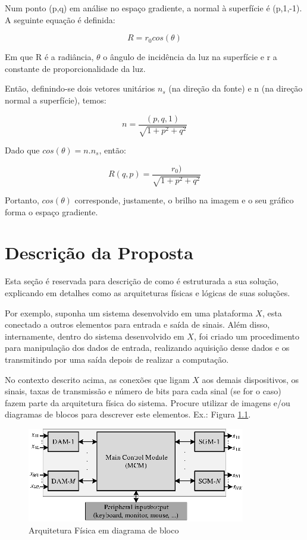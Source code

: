 \documentclass[
	12pt,				%
	openright,			%
	oneside,			%
	a4paper,			%
	brazil,				%
	]{abntex2}
\begin{document}
Num ponto (p,q) em análise no espaço gradiente, a normal à superfície é (p,1,-1). A seguinte equação é definida:

\begin{equation} 
R = r_{0}cos(\theta)
\label{eq:reflectancia}
\end{equation}

Em que R é a radiância, $\theta$ o ângulo de incidência da luz na superfície e r a constante de proporcionalidade da luz.

Então, definindo-se dois vetores unitários $n_{s}$ (na direção da fonte) e n (na direção normal a superfície), temos:

\begin{equation} 
n = \frac{(p,q,1)}{\sqrt{1+p^2+q^2}}
\end{equation}

Dado que $cos(\theta)=n.n_{s}$, então:

\begin{equation} 
R(q,p) = \frac{r_{0})}{\sqrt{1+p^2+q^2}}
\end{equation}

Portanto, $cos(\theta)$ corresponde, justamente, o brilho na imagem e o seu gráfico forma o espaço gradiente.

\chapter{Descrição da Proposta}\label{Descricao}

Esta seção é reservada para descrição de como é estruturada a sua solução, explicando em detalhes como as arquiteturas físicas e lógicas de suas soluções. 

Por exemplo, suponha um sistema desenvolvido em uma plataforma $X$, esta conectado a outros elementos para entrada e saída de sinais. Além disso, internamente, dentro do sistema desenvolvido em $X$, foi criado um procedimento para manipulação dos dados de entrada, realizando aquisição desse dados e os transmitindo por uma saída depois de realizar a computação.

No contexto descrito acima, as conexões que ligam $X$ aos demais dispositivos, os sinais, taxas de transmissão e número de bits para cada sinal (se for o caso) fazem parte da arquitetura física do sistema. Procure utilizar de imagens e/ou diagramas de blocos para descrever este elementos. Ex.: Figura \ref{fig:ArqLogSTRSD}.

\begin{figure}[ht]
    \centering
    \includegraphics[width = 0.85\textwidth]{Imagens/Figura1.eps}
    \caption{Arquitetura Física em diagrama de bloco}
   	\label{fig:ArqLogSTRSD}
\end{figure}  
\end{document}
